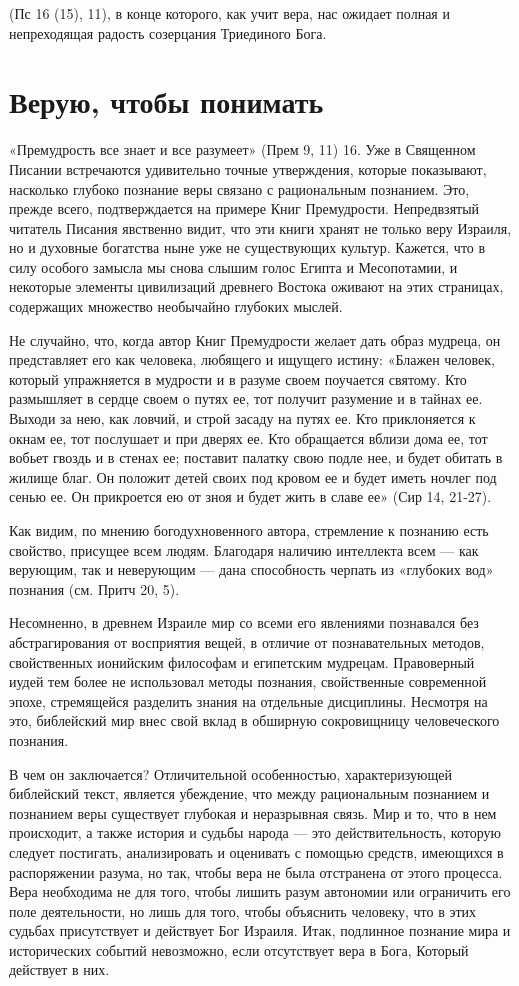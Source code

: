 \documentclass[a5paper,10pt]{article}
\begin{document}
(Пс 16 (15), 11), в конце которого, как учит вера, нас ожидает полная и
непреходящая радость созерцания Триединого Бога.

\section{Верую, чтобы понимать}

«Премудрость все знает и все разумеет» (Прем 9, 11) 16. Уже в Священном Писании
встречаются удивительно точные утверждения, которые показывают, насколько
глубоко познание веры связано с рациональным познанием. Это, прежде всего,
подтверждается на примере Книг Премудрости. Непредвзятый читатель Писания
явственно видит, что эти книги хранят не только веру Израиля, но и духовные
богатства ныне уже не существующих культур. Кажется, что в силу особого замысла
мы снова слышим голос Египта и Месопотамии, и некоторые элементы цивилизаций
древнего Востока оживают на этих страницах, содержащих множество необычайно
глубоких мыслей.

Не случайно, что, когда автор Книг Премудрости желает дать образ мудреца, он
представляет его как человека, любящего и ищущего истину: «Блажен человек,
который упражняется в мудрости и в разуме своем поучается святому. Кто
размышляет в сердце своем о путях ее, тот получит разумение и в тайнах ее.
Выходи за нею, как ловчий, и строй засаду на путях ее. Кто приклоняется к окнам
ее, тот послушает и при дверях ее. Кто обращается вблизи дома ее, тот вобьет
гвоздь и в стенах ее; поставит палатку свою подле нее, и будет обитать в жилище
благ. Он положит детей своих под кровом ее и будет иметь ночлег под сенью ее.
Он прикроется ею от зноя и будет жить в славе ее» (Сир 14, 21-27).

Как видим, по мнению богодухновенного автора, стремление к познанию есть
свойство, присущее всем людям. Благодаря наличию интеллекта всем — как
верующим, так и неверующим — дана способность черпать из «глубоких вод»
познания (см. Притч 20, 5).

Несомненно, в древнем Израиле мир со всеми его явлениями познавался без
абстрагирования от восприятия вещей, в отличие от познавательных методов,
свойственных ионийским философам и египетским мудрецам. Правоверный иудей тем
более не использовал методы познания, свойственные современной эпохе,
стремящейся разделить знания на отдельные дисциплины. Несмотря на это,
библейский мир внес свой вклад в обширную сокровищницу человеческого познания.

В чем он заключается? Отличительной особенностью, характеризующей библейский
текст, является убеждение, что между рациональным познанием и познанием веры
существует глубокая и неразрывная связь. Мир и то, что в нем происходит, а
также история и судьбы народа — это действительность, которую следует
постигать, анализировать и оценивать с помощью средств, имеющихся в
распоряжении разума, но так, чтобы вера не была отстранена от этого процесса.
Вера необходима не для того, чтобы лишить разум автономии или ограничить его
поле деятельности, но лишь для того, чтобы объяснить человеку, что в этих
судьбах присутствует и действует Бог Израиля. Итак, подлинное познание мира и
исторических событий невозможно, если отсутствует вера в Бога, Который
действует в них.
\end{document}
